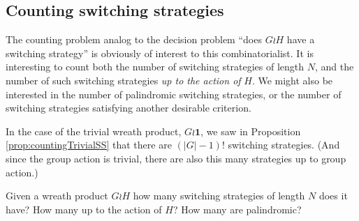 \subsection{Counting switching strategies}
The counting problem analog to the decision problem
``does $G \wr H$ have a switching strategy'' is obviously of interest to this
combinatorialist. It is interesting to count both the number of switching
strategies of length $N$, and the number of such switching strategies
\textit{up to the action of} $H$. We might also be interested in the number of
palindromic switching strategies, or the number of switching strategies
satisfying another desirable criterion.

In the case of the trivial wreath product, $G \wr \mathbf{1}$, we saw in
Proposition \ref{prop:countingTrivialSS} that there are $(|G| - 1)!$
switching strategies. (And since the group action is trivial, there are also
this many strategies up to group action.)

\begin{openquestion}
  Given a wreath product $G \wr H$ how many switching strategies of length $N$
  does it have? How many up to the action of $H$? How many are palindromic?
\end{openquestion}

